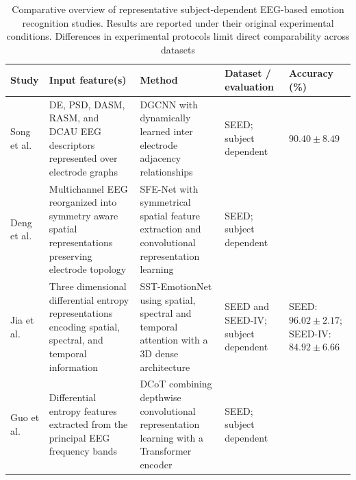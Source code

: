 \documentclass[ASNA,twocolumn]{USG}
\newcommand{\lightrowsep}{%
  \arrayrulecolor{lightrowgray}%
  \specialrule{0.30pt}{3.5pt}{3.5pt}%
  \arrayrulecolor{black}%
}
\begin{document}
\begin{table}
\centering
\caption{Comparative overview of representative subject-dependent EEG-based emotion recognition studies. Results are reported under their original experimental conditions. Differences in experimental protocols limit direct comparability across datasets}
\label{tab:subject_dependent_results}

\scriptsize
\setlength{\tabcolsep}{3.0pt}
\renewcommand{\arraystretch}{1.18}

\begin{tabularx}{\textheight}{
>{\raggedright\arraybackslash}p{3.15cm}
>{\raggedright\arraybackslash}X
>{\raggedright\arraybackslash}X
>{\raggedright\arraybackslash}p{3.65cm}
>{\raggedright\arraybackslash}p{5.15cm}}

\toprule
\textbf{Study} &
\textbf{Input feature(s)} &
\textbf{Method} &
\textbf{Dataset / evaluation} &
\textbf{Accuracy (\%)} \\
\midrule

Song et al. \cite{song2018eeg} &
DE, PSD, DASM, RASM, and DCAU EEG descriptors represented over electrode graphs &
DGCNN with dynamically learned inter electrode adjacency relationships &
SEED; subject dependent &
$90.40 \pm 8.49$ \\

\lightrowsep

Deng et al. \cite{deng2021sfe} &
Multichannel EEG reorganized into symmetry aware spatial representations preserving electrode topology &
SFE-Net with symmetrical spatial feature extraction and convolutional representation learning &
SEED; subject dependent &
99.19 \\

\lightrowsep

Jia et al. \cite{jia2020sst} &
Three dimensional differential entropy representations encoding spatial, spectral, and temporal information &
SST-EmotionNet using spatial, spectral and temporal attention with a 3D dense architecture &
SEED and SEED-IV; subject dependent &
SEED: $96.02 \pm 2.17$;
SEED-IV: $84.92 \pm 6.66$ \\

\lightrowsep

Guo et al. \cite{guo2022transformer} &
Differential entropy features extracted from the principal EEG frequency bands &
DCoT combining depthwise convolutional representation learning with a Transformer encoder &
SEED; subject dependent &
93.83 \\


\end{tabularx}
\end{table}
\end{document}
